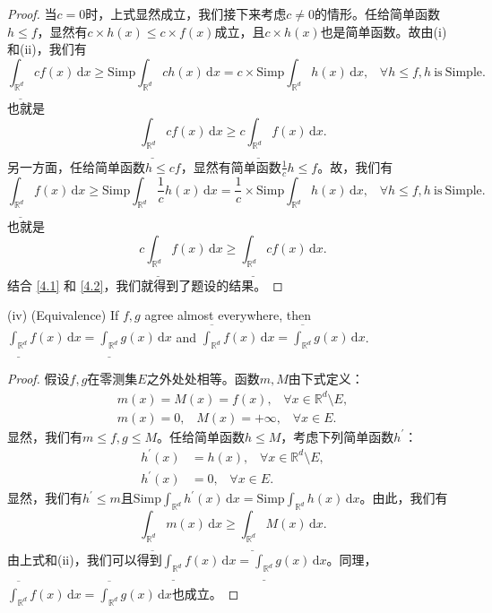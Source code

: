 \documentclass[reqno,a4paper,10pt]{amsart}
\newcommand\dif{\,\mathrm{d}}
\newcommand\Rnum{\mathbb{R}}
\begin{document}
\begin{proof}
    当$c=0$时，上式显然成立，我们接下来考虑$c\neq 0$的情形。任给简单函数$h\leq f$，显然有$c\times h(x)\leq c\times f(x)$成立，且$c\times h(x)$也是简单函数。故由(i)和(ii)，我们有
    \begin{equation*}
        \underline{\int_{\Rnum^d}}cf(x)\dif x\geq \mathrm{Simp}\int_{\Rnum^d} ch(x)\dif x=c\times\mathrm{Simp}\int_{\Rnum^d} h(x)\dif x,\;\;\; \forall h\leq f,h \mathrm{\ is\ Simple}.
    \end{equation*}
    也就是
    \begin{equation}
        \underline{\int_{\Rnum^d}}cf(x)\dif x\geq c\underline{\int_{\Rnum^d}}f(x)\dif x.
        \label{4.1}
    \end{equation}
    另一方面，任给简单函数$h\leq cf$，显然有简单函数$\frac{1}{c} h\leq f$。故，我们有
    \begin{equation*}
        \underline{\int_{\Rnum^d}}f(x)\dif x\geq \mathrm{Simp}\int_{\Rnum^d} \frac{1}{c}h(x)\dif x=\frac{1}{c}\times\mathrm{Simp}\int_{\Rnum^d} h(x)\dif x,\;\;\; \forall h\leq f,h \mathrm{\ is\ Simple}.
    \end{equation*}
    也就是
    \begin{equation}
        c\underline{\int_{\Rnum^d}}f(x)\dif x\geq \underline{\int_{\Rnum^d}}cf(x)\dif x.
        \label{4.2}
    \end{equation}
    结合 \eqref{4.1} 和 \eqref{4.2}，我们就得到了题设的结果。
\end{proof}
(iv) (Equivalence) If $f,g$ agree almost everywhere, then $\underline{\int_{\Rnum^d}}f(x)\dif x=\underline{\int_{\Rnum^d}}g(x)\dif x$ and $\overline{\int_{\Rnum^d}}f(x)\dif x=\overline{\int_{\Rnum^d}}g(x)\dif x$.
\begin{proof}
    假设$f,g$在零测集$E$之外处处相等。函数$m,M$由下式定义：
    \begin{equation*}
        \begin{split}
            m(x)=M(x)=f(x),\;\;\;\forall x\in \Rnum^d \setminus E,\\
            m(x)=0,\;\;\;M(x)=+\infty,\;\;\;\forall x\in E.
        \end{split}
    \end{equation*}
    显然，我们有$m\leq f,g\leq M$。任给简单函数$h\leq M$，考虑下列简单函数$h^\prime$：
    \begin{equation*}
        \begin{split}
            h^\prime(x)&=h(x),\;\;\;\forall x\in\Rnum^d \setminus E,\\
            h^\prime(x)&=0,\;\;\; \forall x\in E.
        \end{split}
    \end{equation*}
    显然，我们有$h^\prime\leq m$且$\mathrm{Simp}\int_{\Rnum^d} h^\prime(x)\dif x=\mathrm{Simp}\int_{\Rnum^d} h(x)\dif x$。由此，我们有
    \begin{equation*}
        \underline{\int_{\Rnum^d}}m(x)\dif x\geq \underline{\int_{\Rnum^d}}M(x)\dif x.
    \end{equation*}
    由上式和(ii)，我们可以得到$\underline{\int_{\Rnum^d}}f(x)\dif x=\underline{\int_{\Rnum^d}}g(x)\dif x$。同理，$\overline{\int_{\Rnum^d}}f(x)\dif x=\overline{\int_{\Rnum^d}}g(x)\dif x$也成立。
\end{proof}
\end{document}
